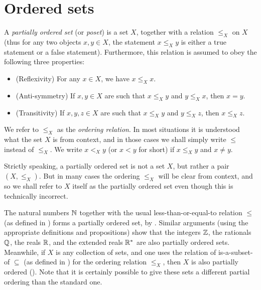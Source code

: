 \section{Ordered sets}\label{i:sec:8.5}

\begin{defn}\label{i:8.5.1}
  A \emph{partially ordered set} (or \emph{poset}) is a set \(X\), together with a relation \(\leq_X\) on \(X\)
  (thus for any two objects \(x, y \in X\), the statement \(x \leq_X y\) is either a true statement or a false statement).
  Furthermore, this relation is assumed to obey the following three properties:
  \begin{itemize}
    \item (Reflexivity) For any \(x \in X\), we have \(x \leq_X x\).
    \item (Anti-symmetry) If \(x, y \in X\) are such that \(x \leq_X y\) and \(y \leq_X x\), then \(x = y\).
    \item (Transitivity) If \(x, y, z \in X\) are such that \(x \leq_X y\) and \(y \leq_X z\), then \(x \leq_X z\).
  \end{itemize}
  We refer to \(\leq_X\) as the \emph{ordering relation}.
  In most situations it is understood what the set \(X\) is from context, and in those cases we shall simply write \(\leq\) instead of \(\leq_X\).
  We write \(x <_X y\) (or \(x < y\) for short) if \(x \leq_X y\) and \(x \neq y\).
\end{defn}

\begin{note}
  Strictly speaking, a partially ordered set is not a set \(X\), but rather a pair \((X, \leq_X)\).
  But in many cases the ordering \(\leq_X\) will be clear from context, and so we shall refer to \(X\) itself as the partially ordered set even though this is technically incorrect.
\end{note}

\begin{eg}\label{i:8.5.2}
  The natural numbers \(\mathbb{N}\) together with the usual less-than-or-equal-to relation \(\leq\) (as defined in ) forms a partially ordered set, by .
  Similar arguments (using the appropriate definitions and propositions) show that the integers \(\mathbb{Z}\), the rationals \(\mathbb{Q}\), the reals \(\mathbb{R}\), and the extended reals \(\mathbb{R}^*\) are also partially ordered sets.
  Meanwhile, if \(X\) is any collection of sets, and one uses the relation of is-a-subset-of \(\subseteq\) (as defined in ) for the ordering relation \(\leq_X\), then \(X\) is also partially ordered ().
  Note that it is certainly possible to give these sets a different partial ordering than the standard one.
\end{eg}

